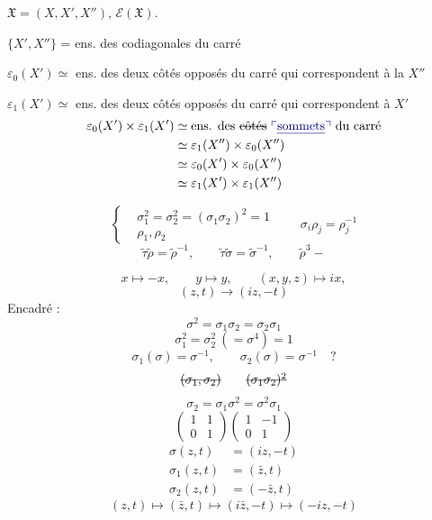 \documentclass[11pt,a4paper]{article}
\begin{document}
$\mathfrak{X} = (X, X', X'')$, $\mathcal{E}(\mathfrak{X})$.

$\{X', X''\}$ = ens. des codiagonales du carré

$\varepsilon_0(X') \simeq$ ens. des deux côtés opposés du carré qui correspondent à la $X''$

$\varepsilon_1(X') \simeq$ ens. des deux côtés opposés du carré qui correspondent à $X'$
\[
\begin{aligned}
\varepsilon_0(X') \times \varepsilon_1(X') &\simeq \text{ens. des \struck{côtés} \add{\uncertain{sommets}} du carré} \\
&\simeq \varepsilon_1(X'') \times \varepsilon_0(X'') \\
&\simeq \varepsilon_0(X') \times \varepsilon_0(X'') \\
&\simeq \varepsilon_1(X') \times \varepsilon_1(X'')
\end{aligned}
\]

\[
\left\{
\begin{aligned}
&\sigma_1^2 = \sigma_2^2 = (\sigma_1\sigma_2)^2 = 1 \\
&\rho_1, \rho_2
\end{aligned}
\right.
\qquad
\sigma_i\rho_j = \rho_j^{-1}
\]
\[
\tilde\tau\tilde\rho = \tilde\rho^{-1}, \qquad \tilde\tau\tilde\sigma = \tilde\sigma^{-1}, \qquad \tilde\rho^3 -
\]

\[
x \longmapsto -x, \qquad y \longmapsto y, \qquad (x, y, z) \longmapsto ix,
\]
\[
(z, t) \longrightarrow (iz, -t)
\]
Encadré :
\[
\sigma^2 = \sigma_1\sigma_2 = \sigma_2\sigma_1
\]
\[
\sigma_1^2 = \sigma_2^2 \ (= \sigma^4) = 1
\]
\[
\sigma_1(\sigma) = \sigma^{-1}, \qquad \sigma_2(\sigma) = \sigma^{-1} \quad ?
\]
\[
\text{\struck{$(\sigma_1, \sigma_2)$}} \qquad \text{\struck{$(\sigma_1\sigma_2)^2$}}
\]
\[
\sigma_2 = \sigma_1\sigma^2 = \sigma^2\sigma_1
\]
\[
\begin{pmatrix} 1 & 1 \\ 0 & 1 \end{pmatrix}
\begin{pmatrix} 1 & -1 \\ 0 & 1 \end{pmatrix}
\]
\[
\begin{aligned}
\sigma(z, t) &= (iz, -t) \\
\sigma_1(z, t) &= (\bar z, t) \\
\sigma_2(z, t) &= (-\bar z, t)
\end{aligned}
\]
\[
(z, t) \longmapsto (\bar z, t) \longmapsto (i\bar z, -t) \longmapsto (-iz, -t)
\]
\end{document}
